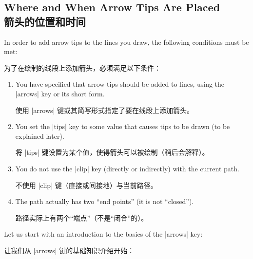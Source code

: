 \subsection{Where and When Arrow Tips Are Placed\\箭头的位置和时间}
\label{section-arrow-tips-where}

In order to add arrow tips to the lines you draw, the following conditions must
be met:


为了在绘制的线段上添加箭头，必须满足以下条件：
%
\begin{enumerate}
    \item You have specified that arrow tips should be added to lines, using
        the |arrows| key or its short form.

        使用 |arrows| 键或其简写形式指定了要在线段上添加箭头。
    \item You set the |tips| key to some value that causes tips to be drawn
        (to be explained later).

        将 |tips| 键设置为某个值，使得箭头可以被绘制（稍后会解释）。
    \item You do not use the |clip| key (directly or indirectly) with the
        current path.

        不使用 |clip| 键（直接或间接地）与当前路径。
    \item The path actually has two ``end points'' (it is not ``closed'').

    路径实际上有两个“端点”（不是“闭合”的）。
\end{enumerate}

Let us start with an introduction to the basics of the |arrows| key:

让我们从 |arrows| 键的基础知识介绍开始：

